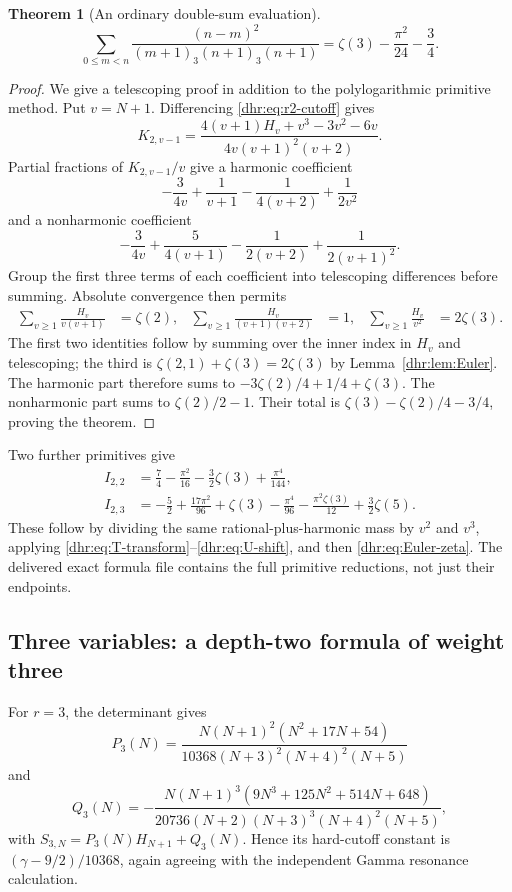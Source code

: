 \documentclass[11pt,letterpaper]{article}
\numberwithin{equation}{section}
\newtheorem{theorem}{Theorem}[section]
\theoremstyle{definition}\newtheorem{definition}[theorem]{Definition}
\theoremstyle{remark}\newtheorem{remark}[theorem]{Remark}
\begin{document}
\begin{theorem}[An ordinary double-sum evaluation]
\label{dhr:thm:first-evaluation}
\begin{equation}\label{dhr:eq:I21}
 \boxed{\displaystyle
 \sum_{0\leq m<n}
 \frac{(n-m)^2}{(m+1)_3(n+1)_3(n+1)}
 =\zeta(3)-\frac{\pi^2}{24}-\frac34.}
\end{equation}
\end{theorem}
\begin{proof}
We give a telescoping proof in addition to the polylogarithmic
primitive method. Put $v=N+1$. Differencing \eqref{dhr:eq:r2-cutoff}
gives
\[
 K_{2,v-1}=\frac{4(v+1)H_v+v^3-3v^2-6v}
 {4v(v+1)^2(v+2)}.
\]
Partial fractions of $K_{2,v-1}/v$ give a harmonic coefficient
\[
 -\frac3{4v}+\frac1{v+1}-\frac1{4(v+2)}+\frac1{2v^2}
\]
and a nonharmonic coefficient
\[
 -\frac3{4v}+\frac5{4(v+1)}-\frac1{2(v+2)}
                                      +\frac1{2(v+1)^2}.
\]
Group the first three terms of each coefficient into telescoping
differences before summing. Absolute convergence then permits
\begin{align*}
 \sum_{v\geq1}\frac{H_v}{v(v+1)}&=\zeta(2),&
 \sum_{v\geq1}\frac{H_v}{(v+1)(v+2)}&=1,&
 \sum_{v\geq1}\frac{H_v}{v^2}&=2\zeta(3).
\end{align*}
The first two identities follow by summing over the inner index in
$H_v$ and telescoping; the third is
$\zeta(2,1)+\zeta(3)=2\zeta(3)$ by
Lemma~\ref{dhr:lem:Euler}. The harmonic part therefore sums to
$-3\zeta(2)/4+1/4+\zeta(3)$. The nonharmonic part sums to
$\zeta(2)/2-1$. Their total is
$\zeta(3)-\zeta(2)/4-3/4$, proving the theorem.
\end{proof}

Two further primitives give
\begin{align}
 I_{2,2}&=\frac74-\frac{\pi^2}{16}-\frac32\zeta(3)
                            +\frac{\pi^4}{144},\label{dhr:eq:I22}\\
 I_{2,3}&=-\frac52+\frac{17\pi^2}{96}+\zeta(3)
             -\frac{\pi^4}{96}-\frac{\pi^2\zeta(3)}{12}
             +\frac32\zeta(5).
 \label{dhr:eq:I23}
\end{align}
These follow by dividing the same rational-plus-harmonic mass by
$v^2$ and $v^3$, applying \eqref{dhr:eq:T-transform}--\eqref{dhr:eq:U-shift},
and then \eqref{dhr:eq:Euler-zeta}. The delivered exact formula file
contains the full primitive reductions, not just their endpoints.

\subsection{Three variables: a depth-two formula of weight three}
For $r=3$, the determinant gives
\begin{equation}\label{dhr:eq:r3-P}
 P_3(N)=\frac{N(N+1)^2(N^2+17N+54)}
 {10368(N+3)^2(N+4)^2(N+5)}
\end{equation}
and
\begin{equation}\label{dhr:eq:r3-Q}
 Q_3(N)=-\frac{N(N+1)^3(9N^3+125N^2+514N+648)}
 {20736(N+2)(N+3)^3(N+4)^2(N+5)},
\end{equation}
with $S_{3,N}=P_3(N)H_{N+1}+Q_3(N)$. Hence its hard-cutoff
constant is $(\gamma-9/2)/10368$, again agreeing with the independent
Gamma resonance calculation.
\end{document}
